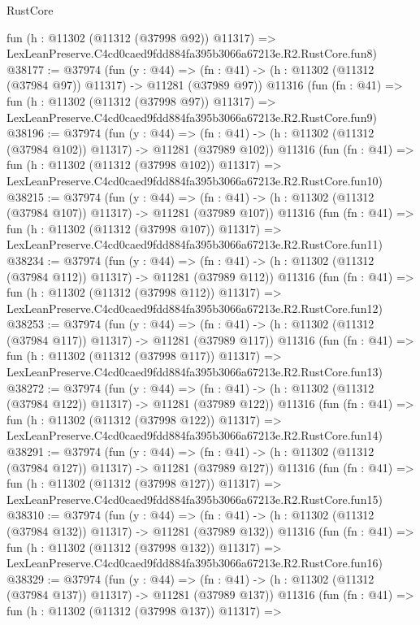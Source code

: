 \begin{lexlean}{RustCore}
\begin{coremodule}
    fun (h : @11302 (@11312 (@37998 @92)) @11317) =>
    LexLeanPreserve.C4cd0caed9fdd884fa395b3066a67213e.R2.RustCore.fun8)
@38177 := @37974
    (fun (y : @44) =>
    (fn : @41) -> (h : @11302 (@11312 (@37984 @97)) @11317) -> @11281 (@37989 @97))
    @11316
    (fun (fn : @41) =>
    fun (h : @11302 (@11312 (@37998 @97)) @11317) =>
    LexLeanPreserve.C4cd0caed9fdd884fa395b3066a67213e.R2.RustCore.fun9)
@38196 := @37974
    (fun (y : @44) =>
    (fn : @41) -> (h : @11302 (@11312 (@37984 @102)) @11317) -> @11281 (@37989 @102))
    @11316
    (fun (fn : @41) =>
    fun (h : @11302 (@11312 (@37998 @102)) @11317) =>
    LexLeanPreserve.C4cd0caed9fdd884fa395b3066a67213e.R2.RustCore.fun10)
@38215 := @37974
    (fun (y : @44) =>
    (fn : @41) -> (h : @11302 (@11312 (@37984 @107)) @11317) -> @11281 (@37989 @107))
    @11316
    (fun (fn : @41) =>
    fun (h : @11302 (@11312 (@37998 @107)) @11317) =>
    LexLeanPreserve.C4cd0caed9fdd884fa395b3066a67213e.R2.RustCore.fun11)
@38234 := @37974
    (fun (y : @44) =>
    (fn : @41) -> (h : @11302 (@11312 (@37984 @112)) @11317) -> @11281 (@37989 @112))
    @11316
    (fun (fn : @41) =>
    fun (h : @11302 (@11312 (@37998 @112)) @11317) =>
    LexLeanPreserve.C4cd0caed9fdd884fa395b3066a67213e.R2.RustCore.fun12)
@38253 := @37974
    (fun (y : @44) =>
    (fn : @41) -> (h : @11302 (@11312 (@37984 @117)) @11317) -> @11281 (@37989 @117))
    @11316
    (fun (fn : @41) =>
    fun (h : @11302 (@11312 (@37998 @117)) @11317) =>
    LexLeanPreserve.C4cd0caed9fdd884fa395b3066a67213e.R2.RustCore.fun13)
@38272 := @37974
    (fun (y : @44) =>
    (fn : @41) -> (h : @11302 (@11312 (@37984 @122)) @11317) -> @11281 (@37989 @122))
    @11316
    (fun (fn : @41) =>
    fun (h : @11302 (@11312 (@37998 @122)) @11317) =>
    LexLeanPreserve.C4cd0caed9fdd884fa395b3066a67213e.R2.RustCore.fun14)
@38291 := @37974
    (fun (y : @44) =>
    (fn : @41) -> (h : @11302 (@11312 (@37984 @127)) @11317) -> @11281 (@37989 @127))
    @11316
    (fun (fn : @41) =>
    fun (h : @11302 (@11312 (@37998 @127)) @11317) =>
    LexLeanPreserve.C4cd0caed9fdd884fa395b3066a67213e.R2.RustCore.fun15)
@38310 := @37974
    (fun (y : @44) =>
    (fn : @41) -> (h : @11302 (@11312 (@37984 @132)) @11317) -> @11281 (@37989 @132))
    @11316
    (fun (fn : @41) =>
    fun (h : @11302 (@11312 (@37998 @132)) @11317) =>
    LexLeanPreserve.C4cd0caed9fdd884fa395b3066a67213e.R2.RustCore.fun16)
@38329 := @37974
    (fun (y : @44) =>
    (fn : @41) -> (h : @11302 (@11312 (@37984 @137)) @11317) -> @11281 (@37989 @137))
    @11316
    (fun (fn : @41) =>
    fun (h : @11302 (@11312 (@37998 @137)) @11317) =>

\end{coremodule}
\end{lexlean}
